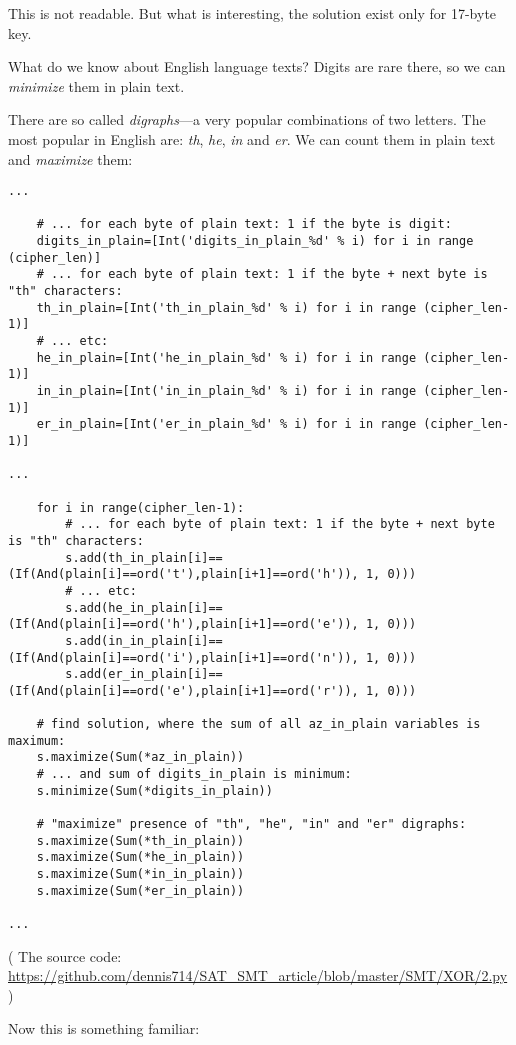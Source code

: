 This is not readable. But what is interesting, the solution exist only for 17-byte key.

What do we know about English language texts?
Digits are rare there, so we can \textit{minimize} them in plain text.

There are so called \textit{digraphs}---a very popular combinations of two letters.
The most popular in English are: \textit{th}, \textit{he}, \textit{in} and \textit{er}.
We can count them in plain text and \textit{maximize} them:

\begin{lstlisting}
...

    # ... for each byte of plain text: 1 if the byte is digit:
    digits_in_plain=[Int('digits_in_plain_%d' % i) for i in range (cipher_len)]
    # ... for each byte of plain text: 1 if the byte + next byte is "th" characters:
    th_in_plain=[Int('th_in_plain_%d' % i) for i in range (cipher_len-1)]
    # ... etc:
    he_in_plain=[Int('he_in_plain_%d' % i) for i in range (cipher_len-1)]
    in_in_plain=[Int('in_in_plain_%d' % i) for i in range (cipher_len-1)]
    er_in_plain=[Int('er_in_plain_%d' % i) for i in range (cipher_len-1)]

...

    for i in range(cipher_len-1):
        # ... for each byte of plain text: 1 if the byte + next byte is "th" characters:
        s.add(th_in_plain[i]==(If(And(plain[i]==ord('t'),plain[i+1]==ord('h')), 1, 0)))
        # ... etc:
        s.add(he_in_plain[i]==(If(And(plain[i]==ord('h'),plain[i+1]==ord('e')), 1, 0)))
        s.add(in_in_plain[i]==(If(And(plain[i]==ord('i'),plain[i+1]==ord('n')), 1, 0)))
        s.add(er_in_plain[i]==(If(And(plain[i]==ord('e'),plain[i+1]==ord('r')), 1, 0)))

    # find solution, where the sum of all az_in_plain variables is maximum:
    s.maximize(Sum(*az_in_plain))
    # ... and sum of digits_in_plain is minimum:
    s.minimize(Sum(*digits_in_plain))

    # "maximize" presence of "th", "he", "in" and "er" digraphs:
    s.maximize(Sum(*th_in_plain))
    s.maximize(Sum(*he_in_plain))
    s.maximize(Sum(*in_in_plain))
    s.maximize(Sum(*er_in_plain))

...
\end{lstlisting}

( The source code: \url{https://github.com/dennis714/SAT_SMT_article/blob/master/SMT/XOR/2.py} )

Now this is something familiar:


